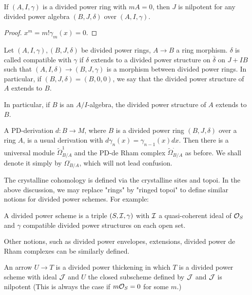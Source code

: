 \begin{proposition}
    If $(A, I, \gamma)$ is a divided power ring with $m A = 0$, 
    then $J$ is nilpotent for any divided power algebra 
    $(B, J, \delta)$ over $(A, I, \gamma)$.
\end{proposition}

\begin{proof}
    $x^m = m! \gamma_m(x) = 0$.
\end{proof}

\begin{definition}
    Let $(A, I, \gamma),(B, J, \delta)$ be divided power rings, 
    $A \to B$ a ring morphism. 
    $\delta$ is called compatible with $\gamma$ 
    if $\delta$ extends to a divided power structure on $\bar{\delta}$ on $J + IB$ 
    such that $(A, I, \delta)\to (B, J, \gamma)$ 
    is a morphism between divided power rings. 
    In particular, if $(B, J, \delta)=(B, 0, 0)$, 
    we say that the divided power structure of $A$ extends to $B$.
\end{definition}
In particular, if $B$ is an $A / I$-algebra, 
the divided power structure of $A$ extends to $B$.
\begin{definition}
    A PD-derivation $d \colon B \to M$, 
    where $B$ is a divided power ring $(B, J, \delta)$ over a ring $A$, 
    is a usual derivation with $d \gamma_n(x) = \gamma_{n-1}(x) dx$. 
    Then there is a universal module $\tilde{\Omega}_{B/A}^1$ 
    and the PD-de Rham complex $\tilde{\Omega}_{B/A}^\cdot$ as before. 
    We shall denote it simply by $\Omega_{B/A}^\cdot$, 
    which will not lead confusion.
\end{definition}
The crystalline cohomology is defined via the crystalline sites and topoi. 
In the above discussion, 
we may replace "rings" by "ringed topoi" 
to define similar notions for divided power schemes. 
For example:
\begin{definition}
    A divided power scheme is a triple $(S, {\mathcal {I}}, \gamma)$ 
    with ${\mathcal {I}}$ a quasi-coherent ideal of ${\mathcal {O}}_S$ 
    and $\gamma$ compatible divided power structures on each open set.
\end{definition}

Other notions, such as divided power envelopes, extensions, 
divided power de Rham complexes can be similarly defined.
\begin{definition}
    An arrow $U \to T$ is a divided power thickening in which 
    $T$ is a divided power scheme with ideal ${\mathcal {J}}$ and 
    $U$ the closed subscheme defined by ${\mathcal {J}}$ and 
    ${\mathcal {J}}$ is nilpotent (This is always the case if $m {\mathcal {O}}_S=0$ for some $m$.)
\end{definition}

